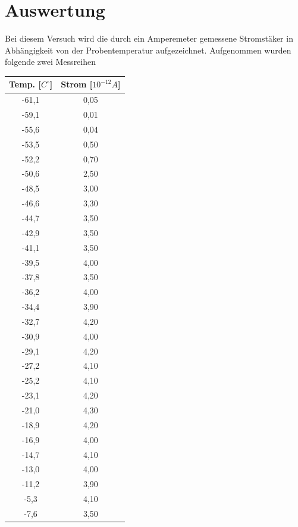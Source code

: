 \section{Auswertung}
Bei diesem Versuch wird die durch ein Amperemeter gemessene Stromstäker in Abhängigkeit von der Probentemperatur aufgezeichnet. Aufgenommen wurden folgende zwei Messreihen\\
\begin{table}
\begin{minipage}{0.45\textwidth}
\begin{tabular}{c|c}
Temp. [$C^\circ$] & Strom [$10^{-12}A$]\\\hline
-61,1	&0,05\\\hline
-59,1	&0,01\\\hline
-55,6	&0,04\\\hline
-53,5	&0,50\\\hline
-52,2	&0,70\\\hline
-50,6	&2,50\\\hline
-48,5	&3,00\\\hline
-46,6	&3,30\\\hline
-44,7	&3,50\\\hline
-42,9	&3,50\\\hline
-41,1	&3,50\\\hline
-39,5	&4,00\\\hline
-37,8	&3,50\\\hline
-36,2	&4,00\\\hline
-34,4	&3,90\\\hline
-32,7	&4,20\\\hline
-30,9	&4,00\\\hline
-29,1	&4,20\\\hline
-27,2	&4,10\\\hline
-25,2	&4,10\\\hline
-23,1	&4,20\\\hline
-21,0	&4,30\\\hline
-18,9	&4,20\\\hline
-16,9	&4,00\\\hline
-14,7	&4,10\\\hline
-13,0	&4,00\\\hline
-11,2	&3,90\\\hline
-5,3	&4,10\\\hline
-7,6	&3,50\\\hline
\end{tabular}
\end{minipage}
\begin{minipage}{0.45\textwidth}
\begin{tabular}{c|c}

\end{tabular}
\end{minipage}
\end{table}
